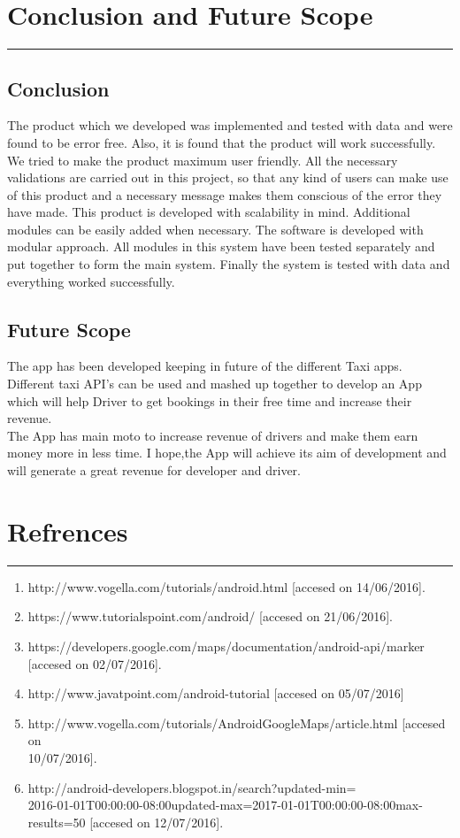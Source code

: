 \chapter{Conclusion and Future Scope}\hrule
\label{Chapter:5}
\section{Conclusion}
The product which we developed was implemented and tested with data and were found to be error free. Also, it is found that the product will work successfully. We tried to make the product maximum user friendly. All the necessary validations are carried out in this project, so that any kind of users can make use of this product and a necessary message makes them conscious of the error they have made. This product is developed
with scalability in mind. Additional modules can be easily added when necessary. The software is developed with modular approach. All modules in this system have been tested separately and put together to form the main system. Finally the system is tested with data and everything worked successfully.
\section{Future Scope}
The app has been developed keeping in future of the different Taxi apps.\\
Different taxi API's can be used and mashed up together to develop an App which will help Driver to get bookings in their free time and increase their revenue.\\
The App has main moto to increase revenue of drivers and make them earn money more in less time. I hope,the App will achieve its aim of development and will generate a great revenue for developer and driver.
\chapter{Refrences}\hrule
\label{Chapter:6}
\begin{enumerate}
	\item http://www.vogella.com/tutorials/android.html [accesed on 14/06/2016].
	\item https://www.tutorialspoint.com/android/ [accesed on 21/06/2016].
	\item https://developers.google.com/maps/documentation/android-api/marker [accesed on 02/07/2016].
	\item http://www.javatpoint.com/android-tutorial [accesed on 05/07/2016]
	\item http://www.vogella.com/tutorials/AndroidGoogleMaps/article.html [accesed on \\10/07/2016].
	\item http://android-developers.blogspot.in/search?updated-min=\\2016-01-01T00:00:00-08:00updated-max=2017-01-01T00:00:00-08:00max-results=50 [accesed on 12/07/2016].
\end{enumerate}